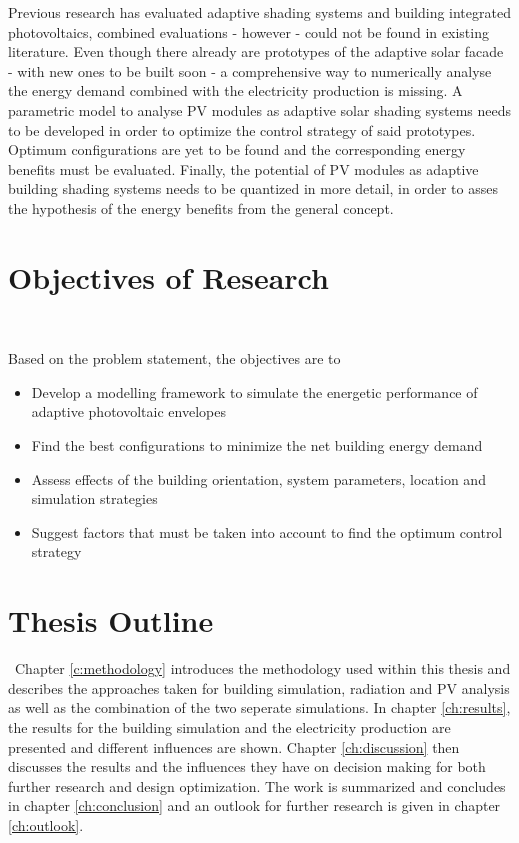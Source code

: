 	Previous research has evaluated adaptive shading systems and building integrated photovoltaics, combined evaluations - however - could not be found in existing literature. Even though there already are prototypes of the adaptive solar facade - with new ones to be built soon - a comprehensive way to numerically analyse the energy demand combined with the electricity production is missing. A parametric model to analyse PV modules as adaptive solar shading systems needs to be developed in order to optimize the control strategy of said prototypes. Optimum configurations are yet to be found and the corresponding energy benefits must be evaluated. Finally, the potential of PV modules as adaptive building shading systems needs to be quantized in more detail, in order to asses the hypothesis of the energy benefits from the general concept.



\section{Objectives of Research}\

	Based on the problem statement, the objectives are to

	\begin{itemize}
		\item Develop a modelling framework to simulate the energetic performance of adaptive photovoltaic envelopes
		\item Find the best configurations to minimize the net building energy demand
		\item Assess effects of the building orientation, system parameters, location and simulation strategies
		\item Suggest factors that must be taken into account to find the optimum control strategy
	\end{itemize}


\section{Thesis Outline}\
	Chapter \ref{c:methodology} introduces the methodology used within this thesis and describes the approaches taken for building simulation, radiation and PV analysis as well as the combination of the two seperate simulations. In chapter \ref{ch:results}, the results for the building simulation and the electricity production are presented and different influences are shown. Chapter \ref{ch:discussion} then discusses the results and the influences they have on decision making for both further research and design optimization. The work is summarized and concludes in chapter \ref{ch:conclusion} and an outlook for further research is given in chapter \ref{ch:outlook}. 

